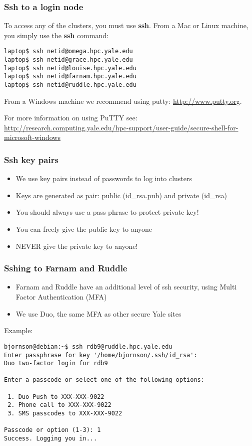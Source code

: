 \documentclass[10pt]{beamer}
\begin{document}
\begin{frame}[fragile]
\frametitle{Ssh to a login node}
To access any of the clusters, you must use \textbf{ssh}.
From a Mac or Linux machine, you simply use the \textbf{ssh} command:

\begin{verbatim}
laptop$ ssh netid@omega.hpc.yale.edu
laptop$ ssh netid@grace.hpc.yale.edu
laptop$ ssh netid@louise.hpc.yale.edu
laptop$ ssh netid@farnam.hpc.yale.edu
laptop$ ssh netid@ruddle.hpc.yale.edu
\end{verbatim}

From a Windows machine we recommend using putty: \url{http://www.putty.org}.

\vskip10pt
For more information on using PuTTY see:
\url{http://research.computing.yale.edu/hpc-support/user-guide/secure-shell-for-microsoft-windows}
\end{frame}

\begin{frame}[fragile]
\frametitle{Ssh key pairs}
\begin{itemize}
\item We use key pairs instead of passwords to log into clusters
\item Keys are generated as pair: public (id\_rsa.pub) and private (id\_rsa)
\item You should always use a pass phrase to protect private key!
\item You can freely give the public key to anyone
\item NEVER give the private key to anyone!
\end{itemize}
\end{frame}

\begin{frame}[fragile]
\frametitle{Sshing to Farnam and Ruddle}

\begin{itemize}
\item Farnam and Ruddle have an additional level of ssh security, using Multi Factor Authentication (MFA)
\item We use Duo, the same MFA as other secure Yale sites
\end{itemize}

Example:
\begin{verbatim}
bjornson@debian:~$ ssh rdb9@ruddle.hpc.yale.edu
Enter passphrase for key '/home/bjornson/.ssh/id_rsa': 
Duo two-factor login for rdb9

Enter a passcode or select one of the following options:

 1. Duo Push to XXX-XXX-9022
 2. Phone call to XXX-XXX-9022
 3. SMS passcodes to XXX-XXX-9022

Passcode or option (1-3): 1
Success. Logging you in...
\end{verbatim}  
\end{frame}
\end{document}
